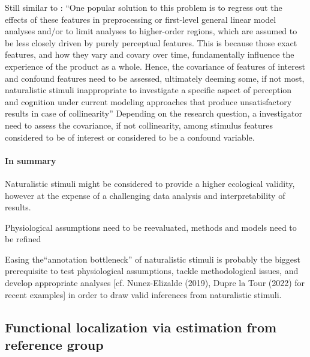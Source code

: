 %
Still similar to \citet{grall2022leveraging}: ``One popular solution to this
problem is to regress out the effects of these features in preprocessing or
first-level general linear model analyses and/or to limit analyses to
higher-order regions, which are assumed to be less closely driven by purely
perceptual features.
%
This is because those exact features, and how they vary and covary over time,
fundamentally influence the experience of the product as a whole.
%
Hence, the covariance of features of interest and confound features need to be
assessed, ultimately deeming some, if not most, naturalistic stimuli
inappropriate to investigate a specific aspect of perception and cognition under
current modeling approaches that produce unsatisfactory results in case of
collinearity''
%
Depending on the research question, a investigator need to assess the
covariance, if not collinearity, among stimulus features considered to be of
interest or considered to be a confound variable.


\paragraph{In summary}

%
Naturalistic stimuli might be considered to provide a higher ecological
validity, however at the expense of a challenging data analysis and
interpretability of results.

%
Physiological assumptions need to be reevaluated, methods and models need to be
refined

%
Easing the``annotation bottleneck'' \citep[][p. 16]{aliko2020naturalistic}  of
naturalistic stimuli is probably the biggest prerequisite to test physiological
assumptions, tackle methodological issues, and develop appropriate analyses [cf.
Nunez-Elizalde (2019), Dupre la Tour (2022) for recent examples] in order to
draw valid inferences from naturalistic stimuli.






\pagebreak



\subsection{Functional localization via estimation from reference group}



